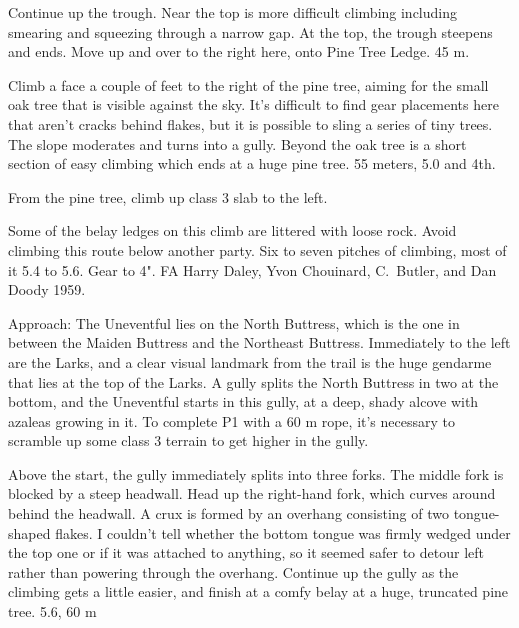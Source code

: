 \documentclass{tahquitz}
\begin{document}
 Continue up the trough. Near the top is more difficult climbing
including smearing and squeezing through a narrow gap. At the top,
the trough steepens and ends. Move up and over to the right here,
onto Pine Tree Ledge. 45 m.

 Climb a face a couple of feet to the right of the pine tree,
aiming for the small oak tree that is visible against the sky. It's
difficult to find gear placements here that aren't cracks behind
flakes, but it is possible to sling a series of tiny trees. The slope
moderates and turns into a gully. Beyond the oak tree is a short
section of easy climbing which ends at a huge pine tree. 55 meters,
5.0 and 4th.

From the pine tree, climb up class 3 slab to the left.

\somespace

\upfriction





Some of the belay ledges on this climb
are littered with loose rock.
Avoid climbing this route below
another party.
Six to seven pitches of climbing, most of it 5.4 to 5.6. Gear to 4".
FA Harry Daley, Yvon Chouinard, C.~Butler, and Dan Doody 1959.

Approach: The Uneventful lies on the North Buttress, which is the one
in between the Maiden Buttress and the Northeast Buttress. Immediately
to the left are the Larks, and a clear visual landmark from the trail
is the huge gendarme that lies at the top of the Larks. A gully
splits the North Buttress in two at the bottom, and the Uneventful starts in this gully,
at a deep, shady alcove with azaleas
growing in it.
To complete P1 with a 60 m rope, it's necessary to scramble up some
class 3 terrain to get higher in the gully.

 Above the start, the gully immediately splits into three
forks. The middle fork is blocked by a steep headwall.
Head up the right-hand fork, which curves around behind
the headwall. A crux is formed by an overhang consisting 
of two tongue-shaped flakes.
I couldn't tell whether the bottom tongue was firmly wedged under the top
one or if it was attached to anything, so it seemed safer to detour left
rather than powering through the overhang. Continue up the gully as the
climbing gets a little easier, and finish at a comfy belay at a huge,
truncated pine tree. 5.6, 60 m
\end{document}
